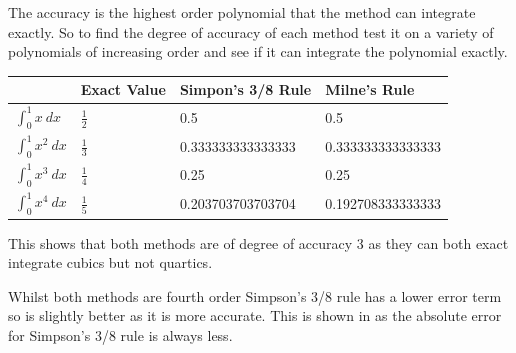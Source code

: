 \documentclass[a4paper,11pt]{article}
\begin{document}
\begin{enumerate}
\begin{enumerate}
		The accuracy is the highest order polynomial that the method can 
		integrate exactly. So to find the degree of accuracy of each method 
		test it on a variety of polynomials of increasing order and see if it 
		can integrate the polynomial exactly.
		
		\begin{center}
			\begin{tabular}{l|lll}
				& Exact Value    & Simpon's 3/8 Rule & Milne's Rule      \\ 
				\hline
				$\int_{0}^{1}x \ dx$     & $\frac{1}{2}$ & 0.5               
				& 0.5               \\
				$\int_{0}^{1}x^{2} \ dx$ & $\frac{1}{3}$ & 0.333333333333333 
				& 0.333333333333333 \\
				$\int_{0}^{1}x^{3} \ dx$ & $\frac{1}{4}$ & 0.25              
				& 0.25              \\
				$\int_{0}^{1}x^{4} \ dx$ & $\frac{1}{5}$ & 0.203703703703704 
				& 0.192708333333333
			\end{tabular}
		\end{center}
		This shows that both methods are of degree of accuracy 3 as they can 
		both exact integrate cubics but not quartics.
		
		Whilst both methods are fourth order Simpson's 3/8 rule has a lower 
		error term so is slightly better as it is more accurate. This is 
		shown in  as the absolute error for Simpson's 
		3/8 rule is always less.
	\end{enumerate}


\end{enumerate}
\end{document}

